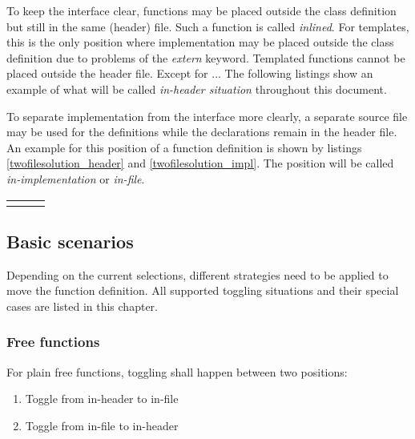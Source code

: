 To keep the interface clear,  functions may be 
placed outside the class definition but still in the same (header) file. Such a 
function is called \textit{inlined}. For templates, this is the only position 
where implementation may be placed outside the class definition due to problems 
of the \textit{extern} keyword. Templated functions cannot be placed outside the 
header file. Except for ... %
The following listings show an example of what will be called 
\textit{in-header situation} throughout this document.



To  separate implementation from the interface more 
clearly, a separate source file may be used for the definitions while the 
declarations remain in the header file. An example for this position of a 
function definition is shown by listings \ref{twofilesolution_header} and
\ref{twofilesolution_impl}. The position will be called 
\textit{in-implementation} or \textit{in-file}.

\begin{tabular}{p{5cm}p{.4cm}p{5cm}}

& & 

\end{tabular}

\subsection{Basic scenarios}

Depending on the current selections, different strategies need to be applied to 
move the function definition. All supported toggling situations and their 
special cases are listed in this chapter.

\subsubsection{Free functions}
For plain free functions, toggling shall happen between two positions:
\begin{enumerate}
\item Toggle from in-header to in-file
\item Toggle from in-file to in-header
\end{enumerate}

